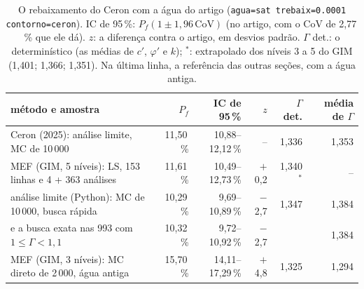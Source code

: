 \begin{table}[H]\centering\footnotesize\setlength{\tabcolsep}{4pt}
\caption{O rebaixamento do Ceron com a água do artigo (\texttt{agua=sat trebaix=0.0001 contorno=ceron}). IC de 95\,\%: $P_f(1 \pm 1{,}96\,\mathrm{CoV})$ (no artigo, com o CoV de 2,77\,\% que ele dá). $z$: a diferença contra o artigo, em desvios padrão. $\Gamma$ det.: o determinístico (as médias de $c'$, $\varphi'$ e $k$); $^*$: extrapolado dos níveis 3 a 5 do GIM (1,401; 1,366; 1,351). Na última linha, a referência das outras seções, com a água antiga.}\label{tab:ceronagua}
\begin{tabular}{lrrrrr}\toprule
método e amostra & $P_f$ & IC de 95\,\% & $z$ & $\Gamma$ det. & média de $\Gamma$ \\\midrule
Ceron (2025): análise limite, MC de 10\,000 & 11,50\,\% & 10,88--12,12\,\% & -- & 1,336 & 1,353 \\
MEF (GIM, 5 níveis): LS, 153 linhas e 4 + 363 análises & 11,61\,\% & 10,49--12,73\,\% & $+$0,2 & 1,340$^*$ & -- \\
análise limite (Python): MC de 10\,000, busca rápida & 10,29\,\% & 9,69--10,89\,\% & $-$2,7 & 1,347 & 1,384 \\
\quad e a busca exata nas 993 com $1 \le \Gamma < 1{,}1$ & 10,32\,\% & 9,72--10,92\,\% & $-$2,7 &  & 1,384 \\
\midrule
MEF (GIM, 3 níveis): MC direto de 2\,000, água antiga & 15,70\,\% & 14,11--17,29\,\% & $+$4,8 & 1,325 & 1,294 \\
\bottomrule\end{tabular}\end{table}
